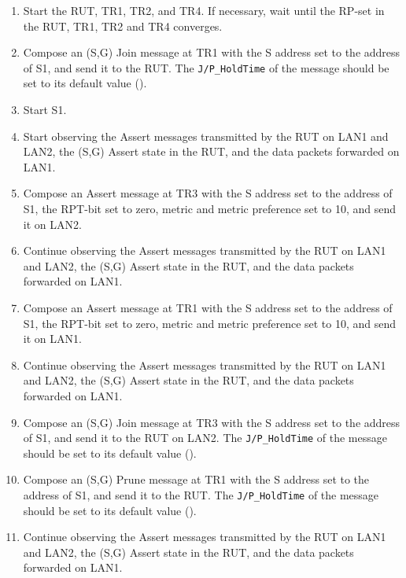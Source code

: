 \documentclass[11pt]{report}
\begin{document}
\begin{enumerate}

  \item Start the RUT, TR1, TR2, and TR4. If necessary, wait until the RP-set
  in the RUT, TR1, TR2 and TR4 converges.

  \item Compose an (S,G) Join message at TR1 with the S address set to the
  address of S1, and send it to the RUT.
  The \verb=J/P_HoldTime= of the message should be set to its default
  value ({\PimsmJPHoldTime}).

  \item Start S1.

  \item Start observing the Assert messages transmitted by the RUT on
  LAN1 and LAN2, the (S,G) Assert state in the RUT, and the data packets
  forwarded on LAN1.

  \item Compose an Assert message at TR3 with the S address set to the
  address of S1, the RPT-bit set to zero, metric and metric preference set to
  10, and send it on LAN2.

  \item Continue observing the Assert messages transmitted by the RUT on
  LAN1 and LAN2, the (S,G) Assert state in the RUT, and the data packets
  forwarded on LAN1.

  \item Compose an Assert message at TR1 with the S address set to the
  address of S1, the RPT-bit set to zero, metric and metric preference set to
  10, and send it on LAN1.

  \item Continue observing the Assert messages transmitted by the RUT on
  LAN1 and LAN2, the (S,G) Assert state in the RUT, and the data packets
  forwarded on LAN1.

  \item Compose an (S,G) Join message at TR3 with the S address set to the
  address of S1, and send it to the RUT on LAN2.
  The \verb=J/P_HoldTime= of the message should be set to its default
  value ({\PimsmJPHoldTime}).

  \item Compose an (S,G) Prune message at TR1 with the S address set to the
  address of S1, and send it to the RUT.
  The \verb=J/P_HoldTime= of the message should be set to its default
  value ({\PimsmJPHoldTime}).

  \item Continue observing the Assert messages transmitted by the RUT on
  LAN1 and LAN2, the (S,G) Assert state in the RUT, and the data packets
  forwarded on LAN1.

\end{enumerate}
\end{document}
